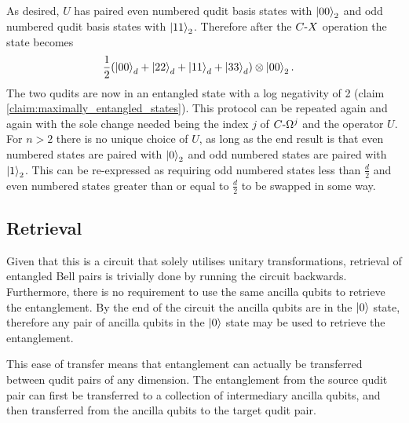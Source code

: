 As desired, $U$ has paired even numbered qudit basis states with $\ket{00}_2$ and odd numbered qudit basis states with $\ket{11}_2$.
Therefore after the $C\text{-}X$ operation the state becomes
\begin{align}
    &\frac{1}{2}
    (\ket{00}_d + \ket{22}_d + \ket{11}_d + \ket{33}_d)
    \otimes\ket{00}_2.
\end{align}
The two qudits are now in an entangled state with a log negativity of 2 (claim \ref{claim:maximally_entangled_states}).
This protocol can be repeated again and again with the sole change needed being the index $j$ of $C\text{-}\Omega^j$ and the operator $U$.
For $n>2$ there is no unique choice of $U$, as long as the end result is that even numbered states are paired with $\ket{0}_2$ and odd numbered states are paired with $\ket{1}_2$.
This can be re-expressed as requiring odd numbered states less than $\frac{d}{2}$ and even numbered states greater than or equal to $\frac{d}{2}$ to be swapped in some way.

\subsection{Retrieval}
\label{subsection:aqcretrieval}
Given that this is a circuit that solely utilises unitary transformations, retrieval of entangled Bell pairs is trivially done by running the circuit backwards.
Furthermore, there is no requirement to use the same ancilla qubits to retrieve the entanglement.
By the end of the circuit the ancilla qubits are in the $\ket{0}$ state, therefore any pair of ancilla qubits in the $\ket{0}$ state may be used to retrieve the entanglement.

This ease of transfer means that entanglement can actually be transferred between qudit pairs of any dimension.
The entanglement from the source qudit pair can first be transferred to a collection of intermediary ancilla qubits, and then transferred from the ancilla qubits to the target qudit pair.